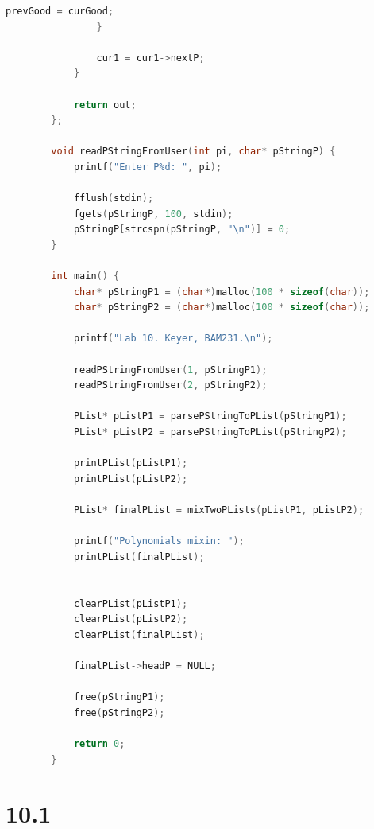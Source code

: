 \documentclass[12pt]{article}
\begin{document}
\begin{lstlisting}[language=C]
					prevGood = curGood;
				}
				
				cur1 = cur1->nextP;
			}
			
			return out;
		};
		
		void readPStringFromUser(int pi, char* pStringP) {
			printf("Enter P%d: ", pi);
			
			fflush(stdin);
			fgets(pStringP, 100, stdin);
			pStringP[strcspn(pStringP, "\n")] = 0;
		}
		
		int main() {
			char* pStringP1 = (char*)malloc(100 * sizeof(char));
			char* pStringP2 = (char*)malloc(100 * sizeof(char));
			
			printf("Lab 10. Keyer, BAM231.\n");
			
			readPStringFromUser(1, pStringP1);
			readPStringFromUser(2, pStringP2);
			
			PList* pListP1 = parsePStringToPList(pStringP1);
			PList* pListP2 = parsePStringToPList(pStringP2);
			
			printPList(pListP1);
			printPList(pListP2);
			
			PList* finalPList = mixTwoPLists(pListP1, pListP2);
			
			printf("Polynomials mixin: ");
			printPList(finalPList);
			
			
			clearPList(pListP1);
			clearPList(pListP2);
			clearPList(finalPList);
			
			finalPList->headP = NULL;
			
			free(pStringP1);
			free(pStringP2);
			
			return 0;
		}
	\end{lstlisting}
	
		\section{10.1}
	
\end{document}

